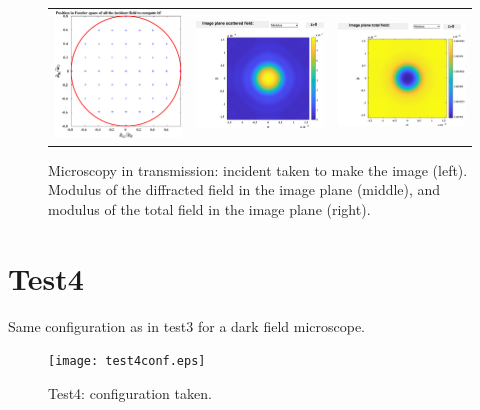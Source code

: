 \begin{figure}[H]
\begin{center}
\begin{tabular}{ccc}
 \includegraphics*[width=5.0cm,draft=false]{test3angleincbf.eps}
&  \includegraphics*[width=5.0cm,draft=false]{test3imagewf.eps}
& \includegraphics*[width=5.0cm,draft=false]{test3imageincwf.eps}
\end{tabular}

\end{center}
\caption{Microscopy in transmission: incident taken to make the image
  (left). Modulus of the diffracted field in the image plane (middle),
  and modulus of the total field in the image plane (right).}
\end{figure}


\section{Test4}

Same configuration as in test3 for a dark field microscope.


\begin{figure}[H]
\begin{center}
  \texttt{[image: test4conf.eps]}
\end{center}
\caption{Test4: configuration taken.}
\label{test4conf}
\end{figure}


